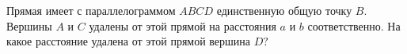 \begin{ex}
	\begin{condition}
		Прямая имеет с параллелограммом \( ABCD \) единственную общую точку \( B \). Вершины \( A  \) и \( C  \) удалены от этой прямой на расстояния \( a  \) и \( b  \) соответственно. На какое расстояние удалена от этой прямой вершина \( D? \)
	\end{condition}
\end{ex}